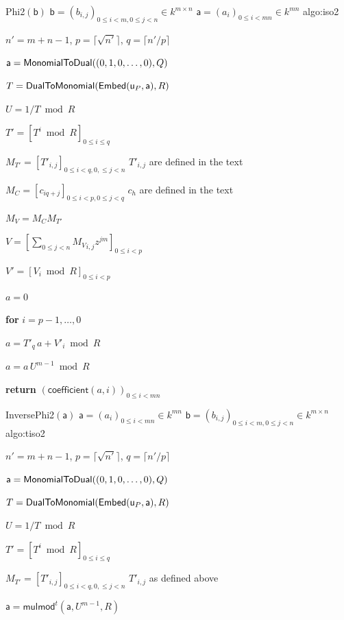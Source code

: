 \documentclass{sig-alternate}
\def\va {\ensuremath{\mathsf{a}}}
\def\vy {\ensuremath{\mathsf{a}}}
\def\vu {\ensuremath{\mathsf{u}}}
\def\vb {\ensuremath{\mathsf{b}}}
\def\coeff {\ensuremath{\mathsf{coefficient}}}
\def\mulmod {\ensuremath{\mathsf{mulmod}}}
\newcounter{algo}
\newenvironment{algorithm_noendline}[4]{\small\begin{center}\begin{minipage}{0.48\textwidth}
      \refstepcounter{algo}
      \label{#4}
      \sf
      \rule{\textwidth}{0.2pt}\\
      \makebox[\textwidth][c]{Algorithm~\arabic{algo}:~\textbf{#1}}\\
      \rule[0.5\baselineskip]{\textwidth}{0.2pt}\\

      \vspace{-12pt}

      \parbox{\textwidth}{\textbf{Input} #2}
      \parbox{\textwidth}{\textbf{Output} #3}

\vspace{-7pt}

      \begin{enumerate*}}{\end{enumerate*}
      \vspace{-11pt}
\end{minipage}\end{center}
}
\newenvironment{algorithm_endline}[4]{\small\begin{center}\begin{minipage}{0.48\textwidth}
      \refstepcounter{algo}
      \label{#4}
      \sf
      \rule{\textwidth}{0.2pt}\\
      \makebox[\textwidth][c]{Algorithm~\arabic{algo}:~\textbf{#1}}\\
      \rule[0.5\baselineskip]{\textwidth}{0.2pt}\\

      \vspace{-12pt}

      \parbox{\textwidth}{\textbf{Input} #2}
      \parbox{\textwidth}{\textbf{Output} #3}

\vspace{-7pt}

      \begin{enumerate*}}{\end{enumerate*}
      \vspace{-11pt}
      \rule{\textwidth}{0.2pt}
\end{minipage}\end{center}
}
\begin{document}
\begin{algofloat}[t]
  \begin{algorithm_noendline}
{Phi2$(\vb)$}      
{$\vb = (b_{i,j})_{0 \le i < m, 0 \le j < n} \in k^{m \times n}$}
{$\va = (a_{i})_{0 \le i < mn} \in k^{m n}$}
{algo:iso2}
\item $n'=m+n-1$, $p=\lceil \sqrt {n'} \rceil$, $q=\lceil n'/p\rceil$
\item $\vy={\sf MonomialToDual}((0,1,0,\dots,0),Q)$ 
\item \label{iso2:2} $T={\sf DualToMonomial}({\sf Embed}(\vu_P, \vy), R)$
\item \label{iso2:3} $U=1/T \bmod R$
\item \label{iso2:4} $T'=[T^i \bmod R]_{0 \le i \le q}$
\item $M_{T'}=[T'_{i,j}]_{0\le i < q, 0, \le j < n}$ \hfill $T'_{i,j}$ are defined in the text
\item $M_C=[c_{iq+j}]_{0 \le i <p, 0 \le j < q}$ \hfill $c_h$ are defined in the text
\item \label{iso2:7} $M_V = M_C M_{T'}$
\item $V=[\sum_{0 \le j <n} {M_V}_{i,j} z^{jm} ]_{0 \le i <p}$
\item $V'=[V_i \bmod R]_{0 \le i <p}$
\item $a=0$
\item {\bf for} {$i=p-1,\dots,0$}\label{iso2:11}
\item \hspace{7mm} $a=T'_q\, a+V'_i \bmod R$
\item \label{iso2:14} $a=a\, U^{m-1} \bmod R$
\item {\bf return} $(\coeff(a,i))_{0 \le i < mn}$
  \end{algorithm_noendline}
  \begin{algorithm_endline}
{InversePhi2$(\va)$}
{$\va = (a_{i})_{0 \le i < mn} \in k^{m n}$}
{$\vb = (b_{i,j})_{0 \le i < m, 0 \le j < n} \in k^{m \times n}$}
{algo:tiso2}
\item $n'=m+n-1$, $p=\lceil \sqrt {n'} \rceil$, $q=\lceil n'/p\rceil$
\item $\vy={\sf MonomialToDual}((0,1,0,\dots,0),Q)$ 
\item $T={\sf DualToMonomial}({\sf Embed}(\vu_P, \vy), R)$
\item $U=1/T \bmod R$
\item $T'=[T^i \bmod R]_{0 \le i \le q}$
\item $M_{T'}=[T'_{i,j}]_{0\le i < q, 0, \le j < n}$ \hfill $T'_{i,j}$ as defined above
\item $\va = \mulmod^t(\va, U^{m-1}, R)$

\end{algorithm_endline}
\end{algofloat}
\end{document}
